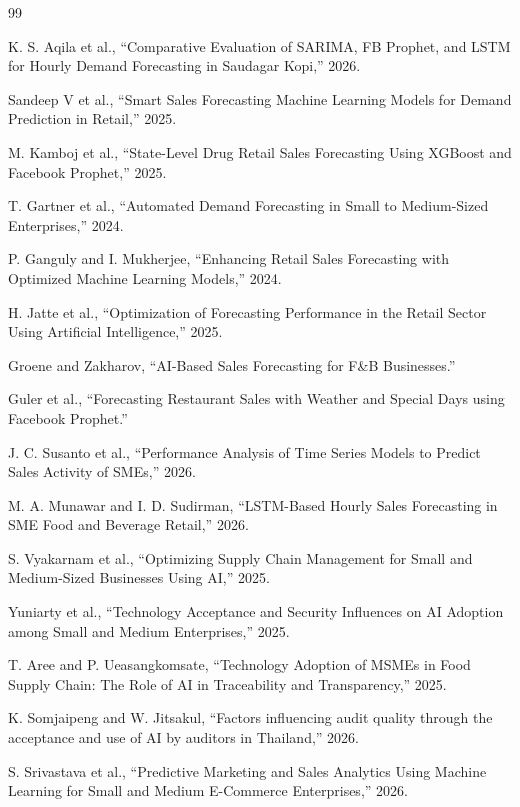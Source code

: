 \documentclass[conference]{IEEEtran}
\begin{document}
\begin{thebibliography}{99}

K. S. Aqila et al., ``Comparative Evaluation of SARIMA, FB Prophet, and
LSTM for Hourly Demand Forecasting in Saudagar Kopi,'' 2026.

Sandeep V et al., ``Smart Sales Forecasting Machine Learning Models for
Demand Prediction in Retail,'' 2025.

M. Kamboj et al., ``State-Level Drug Retail Sales Forecasting Using
XGBoost and Facebook Prophet,'' 2025.

T. Gartner et al., ``Automated Demand Forecasting in Small to
Medium-Sized Enterprises,'' 2024.

P. Ganguly and I. Mukherjee, ``Enhancing Retail Sales Forecasting with
Optimized Machine Learning Models,'' 2024.

H. Jatte et al., ``Optimization of Forecasting Performance in the Retail
Sector Using Artificial Intelligence,'' 2025.

Groene and Zakharov, ``AI-Based Sales Forecasting for F\&B Businesses.''

Guler et al., ``Forecasting Restaurant Sales with Weather and Special
Days using Facebook Prophet.''

J. C. Susanto et al., ``Performance Analysis of Time Series Models to
Predict Sales Activity of SMEs,'' 2026.

M. A. Munawar and I. D. Sudirman, ``LSTM-Based Hourly Sales Forecasting
in SME Food and Beverage Retail,'' 2026.

S. Vyakarnam et al., ``Optimizing Supply Chain Management for Small and
Medium-Sized Businesses Using AI,'' 2025.

Yuniarty et al., ``Technology Acceptance and Security Influences on AI
Adoption among Small and Medium Enterprises,'' 2025.

T. Aree and P. Ueasangkomsate, ``Technology Adoption of MSMEs in Food
Supply Chain: The Role of AI in Traceability and Transparency,'' 2025.

K. Somjaipeng and W. Jitsakul, ``Factors influencing audit quality
through the acceptance and use of AI by auditors in Thailand,'' 2026.

S. Srivastava et al., ``Predictive Marketing and Sales Analytics Using
Machine Learning for Small and Medium E-Commerce Enterprises,'' 2026.


\end{thebibliography}
\end{document}
